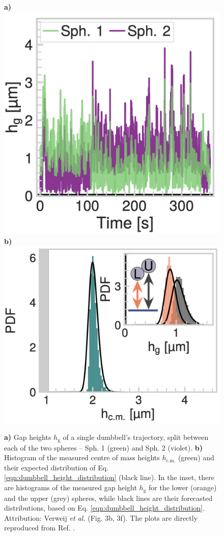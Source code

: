 \documentclass{master_thesis}
\begin{document}
\begin{figure}
    \begin{minipage}{\linewidth}
         \centering
         \textbf{a)}
         \includegraphics[width=0.395\linewidth,valign=t]{figures/small_dumbbell_trajectory.png}
         \textbf{b)}
         \includegraphics[width=0.5\linewidth,valign=t]{figures/large_dumbbells_heights.png}
    \end{minipage}
    \caption{
    \textbf{a)} Gap heights $h_\textrm{g}$ of a single dumbbell's trajectory, split between each of the two spheres -- Sph. 1 (green) and Sph. 2 (violet).
    \textbf{b)} Histogram of the measured centre of mass heights $h_{\textrm{c.m.}}$ (green) and their expected distribution of Eq. \eqref{eqn:dumbbell_height_distribution} (black line). In the inset, there are histograms of the measured gap height $h_{\textrm{g}}$ for the lower (orange) and the upper (grey) spheres, while black lines are their forecasted distributions, based on Eq. \eqref{eqn:dumbbell_height_distribution}. Attribution: Verweij \textit{et al.} \cite{verweij2021} (Fig. 3b, 3f). The plots are directly reproduced from Ref. \cite{verweij2021}.
    }
\label{fig:dumbbell_shortcomings}
\end{figure}
\end{document}
